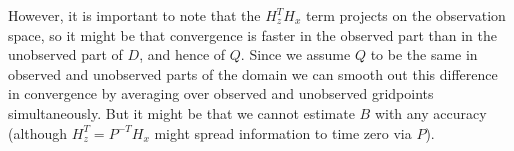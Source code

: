 \documentclass[a4paper,10pt]{article}
\numberwithin{equation}{section}
\begin{document}
However, it is important to note that the $H_z^TH_x$ term projects on the observation space, so it might be that convergence is faster in the observed part than in the unobserved part of $D$, and hence of $Q$. Since we assume $Q$ to be the same in observed and unobserved parts of the domain we can smooth out this difference in convergence by averaging over observed and unobserved gridpoints simultaneously. But it might be that we cannot estimate $B$ with any accuracy (although $H_z^T = P^{-T}H_x$ might spread information to time zero via $P$). 

\newpage
{}

\end{document}
